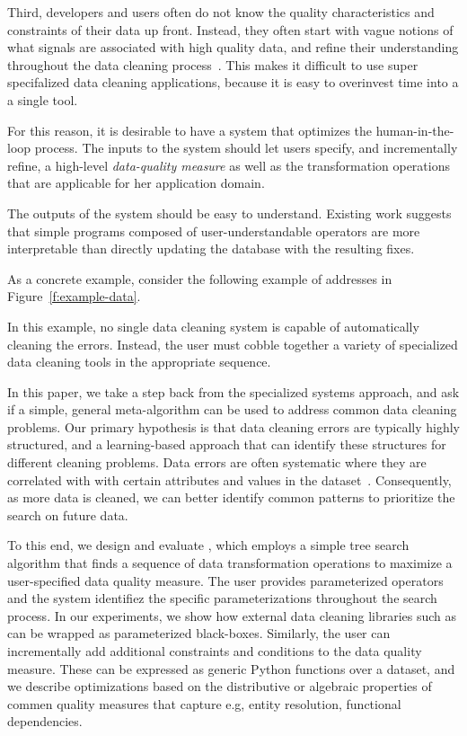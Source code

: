 Third, developers and users often do not know the quality characteristics and constraints of their data up front.  Instead, they often start with vague notions of what signals are associated with high quality data, and refine their understanding throughout the data cleaning process~\cite{}.  This makes it difficult to use super specifalized data cleaning applications, because it is easy to overinvest time into a a single tool. 

For this reason, it is desirable to have a system that optimizes the human-in-the-loop process.  The inputs to the system should let users specify, and incrementally refine, a high-level {\it data-quality measure} as well as the transformation operations that are applicable for her application domain.  

The outputs of the system should be easy to understand.  Existing work suggests that simple programs composed of user-understandable operators are more interpretable than directly updating the database with the resulting fixes.  

As a concrete example, consider the following example of addresses in Figure~\ref{f:example-data}.  

In this example, no single data cleaning system is capable of automatically cleaning the errors.  Instead, the user must cobble together a variety of specialized data cleaning tools in the appropriate sequence.

In this paper, we take a step back from the specialized systems approach, and ask if a simple, general meta-algorithm can be used to address common data cleaning problems.  Our primary hypothesis is that data cleaning errors are typically highly structured, and a learning-based approach that can identify these structures for different cleaning problems.   
Data errors are often systematic where they are correlated with with certain attributes and values in the dataset~\cite{rekatsinas2017holoclean,DBLP:journals/pvldb/KrishnanWWFG16}.
Consequently, as more data is cleaned, we can better identify common patterns to prioritize the search on future data.

To this end, we design and evaluate \sys, which employs a simple tree search algorithm that finds a sequence of data transformation operations to maximize a user-specified data quality measure.   The user provides parameterized operators and the system identifiez the specific parameterizations throughout the search process.  In our experiments, we show how external data cleaning libraries such as  can be wrapped as parameterized black-boxes.  Similarly, the user can incrementally add additional constraints and conditions to the data quality measure.  These can be expressed as generic Python functions over a dataset, and we describe optimizations based on the distributive or algebraic properties of commen quality measures that capture e.g, entity resolution, functional dependencies.

